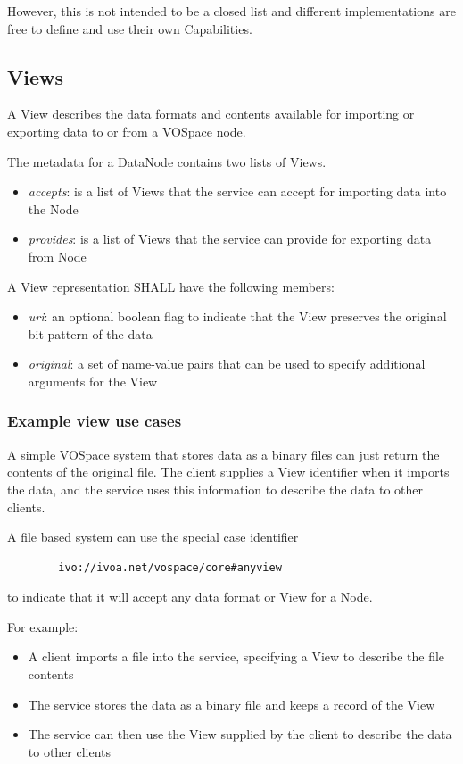 \documentclass[11pt,a4paper]{ivoa}
\begin{document}
However, this is not intended to be a closed list and different implementations are free to define and use their own Capabilities.

\subsection{Views}
\label{subsec:views}
A View describes the data formats and contents available for importing or exporting data to or from a VOSpace node.

The metadata for a DataNode contains two lists of Views.

\begin{itemize}
    \item \emph{accepts}: is a list of Views that the service can accept for importing data into the Node
    \item \emph{provides}: is a list of Views that the service can provide for exporting data from Node
\end{itemize}

A View representation SHALL have the following members:

\begin{itemize}
    \item \emph{uri}: an optional boolean flag to indicate that the View preserves the original bit pattern of the data
    \item \emph{original}: a set of name-value pairs that can be used to specify additional arguments for the View
\end{itemize}

\subsubsection{Example view use cases}
\label{subsubsec:example view use cases}
A simple VOSpace system that stores data as a binary files can just return the contents of the original file. The client supplies a View identifier when it imports the data, and the service uses this information to describe the data to other clients.

A file based system can use the special case identifier
\begin{verbatim}
        ivo://ivoa.net/vospace/core#anyview
\end{verbatim}
to indicate that it will accept any data format or View for a Node.

For example:

\begin{itemize}
    \item A client imports a file into the service, specifying a View to describe the file contents
    \item The service stores the data as a binary file and keeps a record of the View
    \item The service can then use the View supplied by the client to describe the data to other clients
\end{itemize}
\end{document}
